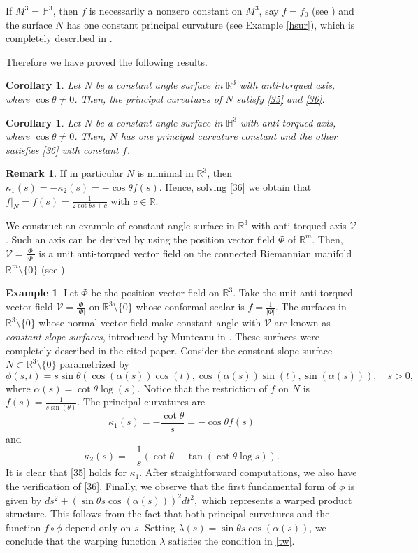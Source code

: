 \documentclass[12pt]{amsart}
\def\r{\mathbb R}
\def\h{\mathbb H}
\def\v{\mathcal V}
\newtheorem{corollary}[theorem]{Corollary}
\theoremstyle{definition}
\newtheorem{example}[theorem]{Example}
\newtheorem{remark}[theorem]{Remark}
\begin{document}
If $M^3=\h^3$, then $f$ is necessarily a nonzero constant on $M^3$, say $f=f_0$ (see \cite[Theorem 4.2]{amc}) and the surface $N$ has one constant principal curvature (see Example \ref{hsur}), which is completely described in \cite{ag}. 

Therefore we have proved the following results.

\begin{corollary} \label{cs1}
Let $N$ be a constant angle surface in $\r^3$ with anti-torqued axis, where $\cos\theta\neq 0$. Then, the principal curvatures of $N$ satisfy \eqref{35} and \eqref{36}.
\end{corollary}

\begin{corollary} \label{cs2}
Let $N$ be a constant angle surface in $\h^3$ with anti-torqued axis, where $\cos\theta\neq 0$. Then, $N$ has one principal curvature constant and the other satisfies \eqref{36} with constant $f$.
\end{corollary}

\begin{remark}
If in particular $N$ is minimal in $\r^3$, then $\kappa_1(s)=-\kappa_2(s)=-\cos\theta f(s)$. Hence, solving \eqref{36} we obtain that $f|_N=f(s)=\frac{1}{2\cot\theta s+c}$ with $c\in \r$.
\end{remark}

We construct an example of constant angle surface in $\r^3$ with anti-torqued axis $\v$. Such an axis can be derived by using the position vector field $\Phi$ of $\r^m$. Then, $\v=\frac{\Phi}{|\Phi|}$ is a unit anti-torqued vector field on the connected Riemannian manifold $\r^m\setminus \{0\}$ (see \cite{dan}). 

\begin{example}
Let $\Phi$ be the position vector field on $\r^3$. Take the unit anti-torqued vector field $\v=\frac{\Phi}{|\Phi|}$ on $\r^3\setminus\{0\}$ whose conformal scalar is $f=\frac{1}{|\Phi|}$. The surfaces in $\r^3\setminus\{0\}$ whose normal vector field make constant angle with $\v$ are known as {\it constant slope surfaces}, introduced by Munteanu in \cite{mun}. These surfaces were completely described in the cited paper. Consider the constant slope surface $N\subset \r^3\setminus\{0\}$ parametrized by
$$
\phi(s,t)=s\sin\theta(\cos(\alpha(s))\cos(t),\cos(\alpha(s))\sin(t),\sin(\alpha(s))), \quad s>0,
$$
where $\alpha(s)=\cot \theta \log(s)$. Notice that the restriction of $f$ on $N$ is $f(s)=\frac{1}{s\sin(\theta)}$. The principal curvatures are 
$$
\kappa_1(s)=-\frac{\cot\theta}{s}=-\cos\theta f(s)
$$
and
$$
\kappa_2(s)=-\frac{1}{s}(\cot\theta+\tan(\cot\theta\log s)).
$$
It is clear that \eqref{35} holds for $\kappa_1$. After straightforward computations, we also have the verification of \eqref{36}. Finally, we observe that the first fundamental form of $\phi$ is given by $ds^2+(\sin\theta s\cos(\alpha(s)))^2dt^2,$ which represents a warped product structure. This follows from the fact that both principal curvatures  and the function $f\circ \phi$ depend only on $s$. Setting $\lambda(s)=\sin\theta s\cos(\alpha(s))$, we conclude that the warping function $\lambda $ satisfies the condition in \eqref{tw}.
\end{example}
\end{document}
